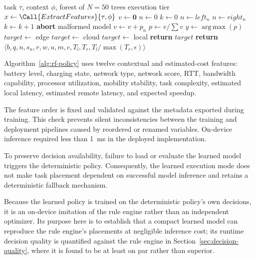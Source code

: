 \begin{algorithm}[t]
\caption{On-device inference procedure used by the Random Forest planning policy.}
\label{alg:rf-policy}
\begin{algorithmic}[1]
\Require task $\tau$, context $\phi$, forest of $N=50$ trees
\Ensure execution tier
\State $x \gets \Call{ExtractFeatures}{\tau,\phi}$
\State $v \gets \mathbf{0}$
    \State $n \gets 0$
    \State $k \gets 0$
            \State $n \gets left_n$
        \Else
            \State $n \gets right_n$
        \EndIf
        \State $k \gets k+1$
            \State \textbf{abort} malformed model
        \EndIf
    \EndWhile
    \State $v \gets v+p_n$
\EndFor
\State $p \gets v/\sum v$
\State $y \gets \operatorname*{arg\,max}(p)$
    \State $target \gets$ edge
    \State $target \gets$ cloud
\Else
    \State $target \gets$ local
\EndIf
\State \textbf{return} $target$
    \State \textbf{return} $\langle b,q,n,s_n,r,w,u,m,c,T_l,T_r,T_l/\max(T_r,\epsilon)\rangle$
\EndFunction
\end{algorithmic}
\end{algorithm}

Algorithm~\ref{alg:rf-policy} uses twelve contextual and estimated-cost features: battery level,
charging state, network type, network score, RTT, bandwidth capability,
processor utilization, mobility stability, task complexity, estimated local
latency, estimated remote latency, and expected speedup.

The feature order is fixed and validated against the metadata exported during
training. This check prevents silent inconsistencies between the training and
deployment pipelines caused by reordered or renamed variables. On-device
inference required less than 1~ms in the deployed implementation.

To preserve decision availability, failure to load or evaluate the learned
model triggers the deterministic policy. Consequently, the learned execution
mode does not make task placement dependent on successful model inference and
retains a deterministic fallback mechanism.

Because the learned policy is trained on the deterministic policy's own
decisions, it is an on-device imitation of the rule engine rather than an
independent optimizer. Its purpose here is to establish that a compact learned
model can reproduce the rule engine's placements at negligible inference cost;
its runtime decision quality is quantified against the rule engine in
Section~\ref{sec:decision-quality}, where it is found to be at least on par
rather than superior.



